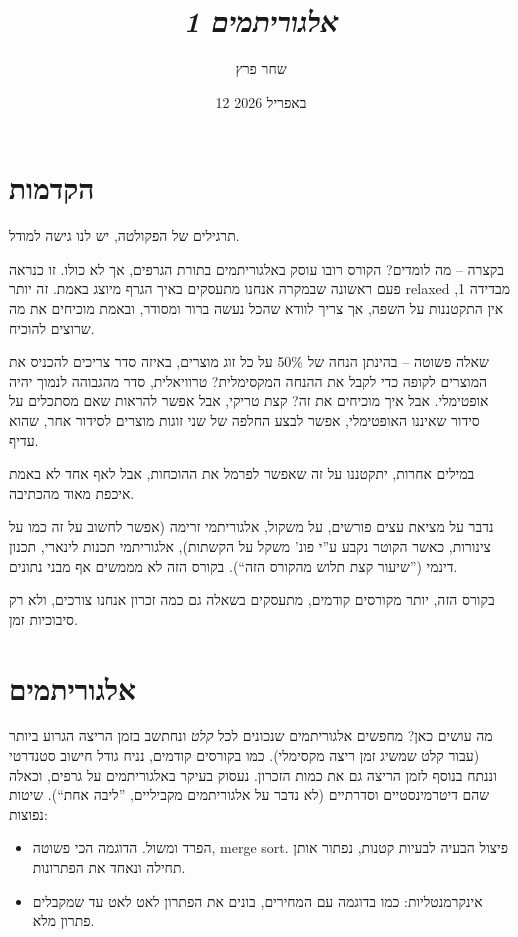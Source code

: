 \documentclass[]{../../../../tex/classes/styledArticle}
\author{שחר פרץ}
\title{\textit{אלגוריתמים 1}}
\date{12 באפריל 2026}
\begin{document}
	\maketitle
	
	\section{הקדמות}
	תרגילים של הפקולטה, יש לנו גישה למודל. 
	
	בקצרה – מה לומדים? הקורס רובו עוסק באלגוריתמים בתורת הגרפים, אך לא כולו. זו כנראה פעם ראשונה שבמקרה אנחנו מתעסקים באיך הגרף מיוצג באמת. זה יותר relaxed מבדידה 1, אין התקטננות על השפה, אך צריך לוודא שהכל נעשה ברור ומסודר, ובאמת מוכיחים את מה שרוצים להוכיח. 
	
	שאלה פשוטה – בהינתן הנחה של 50\% על כל זוג מוצרים, באיזה סדר צריכים להכניס את המוצרים לקופה כדי לקבל את ההנחה המקסימלית? טרוויאלית, סדר מהגבוהה לנמוך יהיה אופטימלי. אבל איך מוכיחים את זה?  קצת טריקי, אבל אפשר להראות שאם מסתכלים על סידור שאיננו האופטימלי, אפשר לבצע החלפה של שני זוגות מוצרים לסידור אחר, שהוא עדיף. 
	
	במילים אחרות, יתקטננו על זה שאפשר לפרמל את ההוכחות, אבל לאף אחד לא באמת איכפת מאוד מהכתיבה. 
	
	נדבר על מציאת עצים פורשים, על משקול, אלגוריתמי זרימה (אפשר לחשוב על זה כמו על צינורות, כאשר הקוטר נקבע ע''י פונ' משקל על הקשתות), אלגוריתמי תכנות לינארי, תכנון דינמי (''שיעור קצת תלוש מהקורס הזה``). בקורס הזה לא מממשים אף מבני נתונים. 
	
	בקורס הזה, יותר מקורסים קודמים, מתעסקים בשאלה גם כמה זכרון אנחנו צורכים, ולא רק סיבוכיות זמן. 
	
	\section{אלגוריתמים}
	מה עושים כאן? מחפשים אלגוריתמים שנכונים לכל \textit{קלט} ונחתשב בזמן הריצה הגרוע ביותר (עבור קלט שמשיג זמן ריצה מקסימלי). כמו בקורסים קודמים, נניח גודל חישוב סטנדרטי וננתח בנוסף לזמן הריצה גם את כמות הזכרון. נעסוק בעיקר באלגוריתמים על גרפים, וכאלה שהם דיטרמינסטיים וסדרתיים (לא נדבר על אלגוריתמים מקביליים, ''ליבה אחת``). שיטות נפוצות: 
	\begin{itemize}
		\item הפרד ומשול. הדוגמה הכי פשוטה, merge sort. פיצול הבעיה לבעיות קטנות, נפתור אותן תחילה ונאחד את הפתרונות. 
		\item אינקרמנטליות: כמו בדוגמה עם המחירים, בונים את הפתרון לאט לאט עד שמקבלים פתרון מלא. 
	\end{itemize}
	
\end{document}
